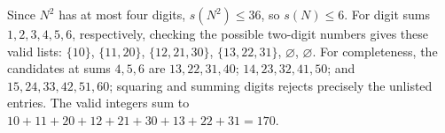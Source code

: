 Since $N^2$ has at most four digits, $s(N^2)\le36$, so $s(N)\le6$. For digit sums $1,2,3,4,5,6$, respectively, checking the possible two-digit numbers gives these valid lists: $\{10\}$, $\{11,20\}$, $\{12,21,30\}$, $\{13,22,31\}$, $\varnothing$, $\varnothing$. For completeness, the candidates at sums $4,5,6$ are $13,22,31,40$; $14,23,32,41,50$; and $15,24,33,42,51,60$; squaring and summing digits rejects precisely the unlisted entries. The valid integers sum to $10+11+20+12+21+30+13+22+31=\boxed{170}$.
